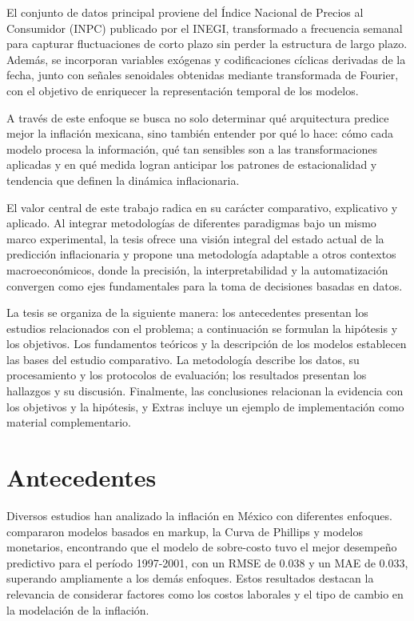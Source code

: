 \documentclass[12pt,letterpaper]{article}
\begin{document}
El conjunto de datos principal proviene del Índice Nacional de Precios al Consumidor (INPC) publicado por el INEGI, transformado a frecuencia semanal para capturar fluctuaciones de corto plazo sin perder la estructura de largo plazo. Además, se incorporan variables exógenas y codificaciones cíclicas derivadas de la fecha, junto con señales senoidales obtenidas mediante transformada de Fourier, con el objetivo de enriquecer la representación temporal de los modelos.

A través de este enfoque se busca no solo determinar qué arquitectura predice mejor la inflación mexicana, sino también entender por qué lo hace: cómo cada modelo procesa la información, qué tan sensibles son a las transformaciones aplicadas y en qué medida logran anticipar los patrones de estacionalidad y tendencia que definen la dinámica inflacionaria.

El valor central de este trabajo radica en su carácter comparativo, explicativo y aplicado. Al integrar metodologías de diferentes paradigmas bajo un mismo marco experimental, la tesis ofrece una visión integral del estado actual de la predicción inflacionaria y propone una metodología adaptable a otros contextos macroeconómicos, donde la precisión, la interpretabilidad y la automatización convergen como ejes fundamentales para la toma de decisiones basadas en datos. 



La tesis se organiza de la siguiente manera: los antecedentes presentan los estudios relacionados con el problema; a continuación se formulan la hipótesis y los objetivos. Los fundamentos teóricos y la descripción de los modelos establecen las bases del estudio comparativo. La metodología describe los datos, su procesamiento y los protocolos de evaluación; los resultados presentan los hallazgos y su discusión. Finalmente, las conclusiones relacionan la evidencia con los objetivos y la hipótesis, y Extras incluye un ejemplo de implementación como material complementario.

\section{Antecedentes}
Diversos estudios han analizado la inflación en México con diferentes enfoques. \cite{bailliu2003explaining} compararon modelos basados en markup, la Curva de Phillips y modelos monetarios, encontrando que el modelo de sobre-costo tuvo el mejor desempeño predictivo para el período 1997-2001, con un RMSE de 0.038 y un MAE de 0.033, superando ampliamente a los demás enfoques. Estos resultados destacan la relevancia de considerar factores como los costos laborales y el tipo de cambio en la modelación de la inflación.
\end{document}
